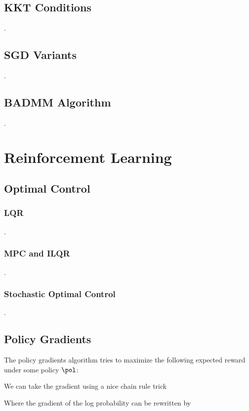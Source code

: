 \documentclass[12pt]{article}
\begin{document}
\subsection{KKT Conditions}
.
\subsection{SGD Variants}
.
\subsection{BADMM Algorithm}
.
\section{Reinforcement Learning}

\subsection{Optimal Control}

\subsubsection{LQR}
.
\subsubsection{MPC and ILQR}
.
\subsubsection{Stochastic Optimal Control}
.
\subsection{Policy Gradients}

The policy gradients algorithm tries to maximize the following expected reward under some policy $\pol$:


We can take the gradient using a nice chain rule trick


Where the gradient of the log probability can be rewritten by
\end{document}
